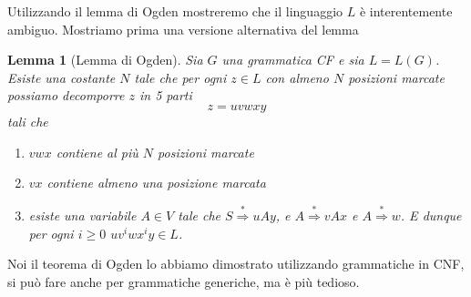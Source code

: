 \documentclass[12pt]{report}
\newtheorem{lemma}{Lemma}
\theoremstyle{definition}
\theoremstyle{regard}
\begin{document}
Utilizzando il lemma di Ogden mostreremo che il linguaggio $L$ è interentemente ambiguo.
Mostriamo prima una versione alternativa del lemma
\begin{lemma}[Lemma di Ogden]
	Sia $G$ una grammatica CF e sia $L = L(G)$.
	Esiste una costante $N$ tale che per ogni $z \in L$ con almeno $N$ posizioni marcate possiamo decomporre $z$ in 5 parti
	$$ z = uvwxy $$
	tali che
	\begin{enumerate}
		\item $vwx$ contiene al più $N$ posizioni marcate
		\item $vx$ contiene almeno una posizione marcata
		\item esiste una variabile $A \in V$ tale che $S \overset{*}{\Rightarrow} uAy$, e $A \overset{*}{\Rightarrow} vAx$ e $A \overset{*}{\Rightarrow} w$.
			E dunque per ogni $i \geq 0$ $u v^i w x^i y \in L$.
	\end{enumerate}
\end{lemma}
Noi il teorema di Ogden lo abbiamo dimostrato utilizzando grammatiche in CNF, si può fare anche per grammatiche generiche, ma è più tedioso.
\end{document}
